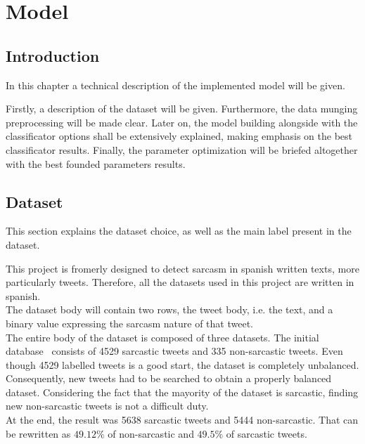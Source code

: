 \chapter{Model}
\label{chap:model}

\section{Introduction}
\label{sec:introduction}
In this chapter a technical description of the implemented model will be given.\par 
Firstly, a description of the dataset will be given. Furthermore, the data munging preprocessing will be made clear. Later on, the model building alongside with the classificator options shall be extensively explained, making emphasis on the best classificator results. Finally, the parameter optimization will be briefed altogether with the best founded parameters results.
\section{Dataset}
\label{sec:use-cases}
This section explains the dataset choice, as well as the main label present in the dataset.\par
This project is fromerly designed to detect sarcasm in spanish written texts, more particularly tweets. Therefore, all the datasets used in this project are written in spanish.\\
The dataset body will contain two rows, the tweet body, i.e. the text, and a binary value expressing the sarcasm nature of that tweet.\\
The entire body of the dataset is composed of three datasets. The initial database~\cite{mexic} consists of 4529 sarcastic tweets and 335 non-sarcastic tweets. Even though 4529 labelled tweets is a good start, the dataset is completely unbalanced. Consequently, new tweets had to be searched to obtain a properly balanced dataset. Considering the fact that the mayority of the dataset is sarcastic, finding new non-sarcastic tweets is not a difficult duty.\\
At the end, the result was 5638 sarcastic tweets and 5444 non-sarcastic. That can be rewritten as $49.12\%$ of non-sarcastic and $49.5\%$ of sarcastic tweets.\par

